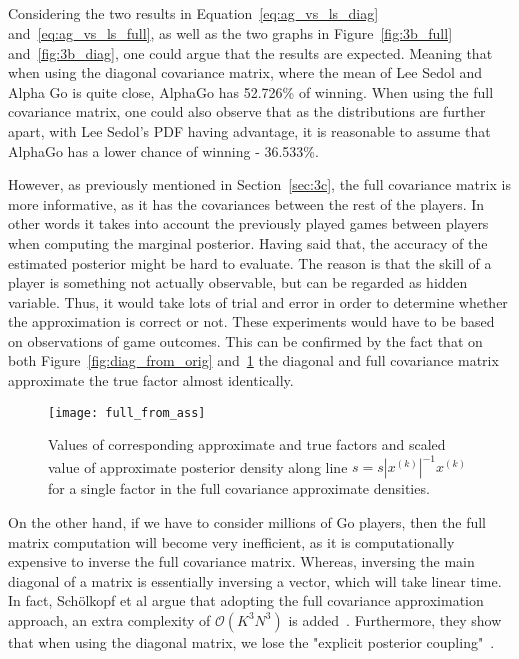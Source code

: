 \documentclass[a4paper,11pt]{article}
\theoremstyle{mytheor}
\begin{document}
\subsection{}
Considering the two results in Equation~\ref{eq:ag_vs_ls_diag} and~\ref{eq:ag_vs_ls_full}, as well as the two graphs in Figure~\ref{fig:3b_full} and~\ref{fig:3b_diag}, one could argue that the results are expected. Meaning that when using the diagonal covariance matrix, where the mean of Lee Sedol and Alpha Go is quite close, AlphaGo has 52.726\% of winning. When using the full covariance matrix, one could also observe that as the distributions are further apart, with Lee Sedol's PDF having advantage, it is reasonable to assume that AlphaGo has a lower chance of winning - 36.533\%.

However, as previously mentioned in Section~\ref{sec:3c}, the full covariance matrix is more informative, as it has the covariances between the rest of the players. In other words it takes into account the previously played games between players when computing the marginal posterior. Having said that, the accuracy of the estimated posterior might be hard to evaluate. The reason is that the skill of a player is something not actually observable, but can be regarded as hidden variable. Thus, it would take lots of trial and error in order to determine whether the approximation is correct or not. These experiments would have to be based on observations of game outcomes.
This can be confirmed by the fact that on both Figure~\ref{fig:diag_from_orig} and~\ref{fig:full_from_orig} the diagonal and full covariance matrix approximate the true factor almost identically.

\begin{figure}[htpb!]
    \centering
    \texttt{[image: full\_from\_ass]}
    \caption{Values of corresponding approximate and true factors and scaled value of approximate posterior density along line $s=s|x^{(k)}|^{-1}x^{(k)}$ for a single factor in the full covariance approximate densities.}
    \label{fig:full_from_orig}
\end{figure}

On the other hand, if we have to consider millions of Go players, then the full matrix computation will become very inefficient, as it is computationally expensive to inverse the full covariance matrix. Whereas, inversing the main diagonal of a matrix is essentially inversing a vector, which will take linear time. In fact, Sch{\"o}lkopf et al argue that adopting the full covariance approximation approach, an extra complexity of $\mathcal{O}(K^3N^3)$ is added~\cite{scholkopf2007advances}. Furthermore, they show that when using the diagonal matrix, we lose the "explicit posterior coupling"~\cite{scholkopf2007advances}.
\end{document}
